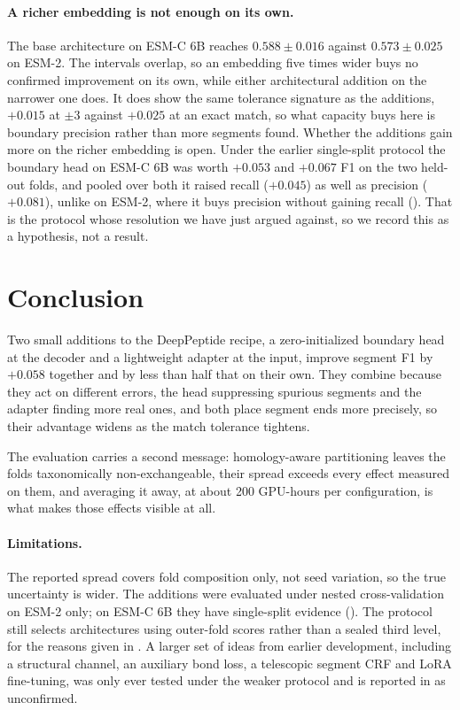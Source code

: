 \documentclass{article}
\begin{document}
\paragraph{A richer embedding is not enough on its own.} The base architecture on ESM-C 6B reaches $0.588\pm0.016$ against $0.573\pm0.025$ on ESM-2. The intervals overlap, so an embedding five times wider buys no confirmed improvement on its own, while either architectural addition on the narrower one does. It does show the same tolerance signature as the additions, $+0.015$ at $\pm3$ against $+0.025$ at an exact match, so what capacity buys here is boundary precision rather than more segments found. Whether the additions gain more on the richer embedding is open. Under the earlier single-split protocol the boundary head on ESM-C 6B was worth $+0.053$ and $+0.067$ F1 on the two held-out folds, and pooled over both it raised recall ($+0.045$) as well as precision ($+0.081$), unlike on ESM-2, where it buys precision without gaining recall (). That is the protocol whose resolution we have just argued against, so we record this as a hypothesis, not a result.

\section{Conclusion}
\label{sec:conclusion}

Two small additions to the DeepPeptide recipe, a zero-initialized boundary head at the decoder and a lightweight adapter at the input, improve segment F1 by $+0.058$ together and by less than half that on their own. They combine because they act on different errors, the head suppressing spurious segments and the adapter finding more real ones, and both place segment ends more precisely, so their advantage widens as the match tolerance tightens.

The evaluation carries a second message: homology-aware partitioning leaves the folds taxonomically non-exchangeable, their spread exceeds every effect measured on them, and averaging it away, at about 200 GPU-hours per configuration, is what makes those effects visible at all.

\paragraph{Limitations.} The reported spread covers fold composition only, not seed variation, so the true uncertainty is wider. The additions were evaluated under nested cross-validation on ESM-2 only; on ESM-C 6B they have single-split evidence (). The protocol still selects architectures using outer-fold scores rather than a sealed third level, for the reasons given in . A larger set of ideas from earlier development, including a structural channel, an auxiliary bond loss, a telescopic segment CRF and LoRA fine-tuning, was only ever tested under the weaker protocol and is reported in  as unconfirmed.
\end{document}
